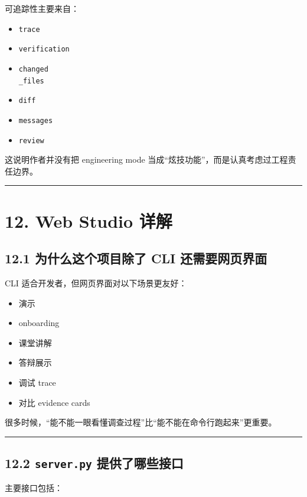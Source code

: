 \documentclass[UTF8,12pt,openany]{ctexbook}
\begin{document}
可追踪性主要来自：\par

\begin{itemize}
\item \texttt{trace}
\item \texttt{verification}
\item \texttt{changed\\_files}
\item \texttt{diff}
\item \texttt{messages}
\item \texttt{review}
\end{itemize}

这说明作者并没有把 engineering mode 当成“炫技功能”，而是认真考虑过工程责任边界。\par

\hrule

\section{12. Web Studio 详解}

\subsection{12.1 为什么这个项目除了 CLI 还需要网页界面}

CLI 适合开发者，但网页界面对以下场景更友好：\par

\begin{itemize}
\item 演示
\item onboarding
\item 课堂讲解
\item 答辩展示
\item 调试 trace
\item 对比 evidence cards
\end{itemize}

很多时候，“能不能一眼看懂调查过程”比“能不能在命令行跑起来”更重要。\par

\hrule

\subsection{12.2 \texttt{server.py} 提供了哪些接口}

主要接口包括：\par
\end{document}
